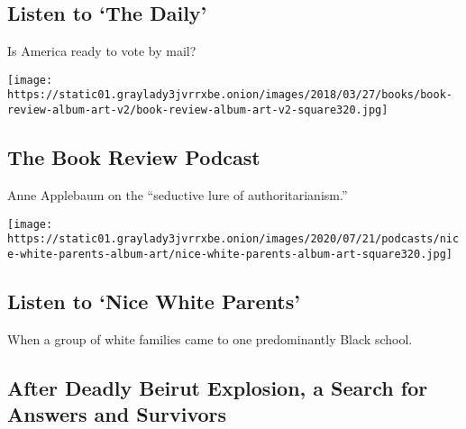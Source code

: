 \href{/2020/08/04/podcasts/the-daily/mail-in-voting-president-trump.html}{}

\hypertarget{listen-to-the-daily}{%
\subsection{Listen to `The Daily'}\label{listen-to-the-daily}}

Is America ready to vote by mail?

\href{/2020/07/31/books/review/podcast-twilight-democracy-anne-applebaum-eat-buddha-barbara-demick.html}{}

\texttt{[image: https://static01.graylady3jvrrxbe.onion/images/2018/03/27/books/book-review-album-art-v2/book-review-album-art-v2-square320.jpg]}

\href{/2020/07/31/books/review/podcast-twilight-democracy-anne-applebaum-eat-buddha-barbara-demick.html}{}

\hypertarget{the-book-review-podcast}{%
\subsection{The Book Review Podcast}\label{the-book-review-podcast}}

Anne Applebaum on the ``seductive lure of authoritarianism.''

\href{/2020/07/30/podcasts/nice-white-parents-serial.html}{}

\texttt{[image: https://static01.graylady3jvrrxbe.onion/images/2020/07/21/podcasts/nice-white-parents-album-art/nice-white-parents-album-art-square320.jpg]}

\href{/2020/07/30/podcasts/nice-white-parents-serial.html}{}

\hypertarget{listen-to-nice-white-parents}{%
\subsection{Listen to `Nice White
Parents'}\label{listen-to-nice-white-parents}}

When a group of white families came to one predominantly Black school.

\href{/2020/08/05/world/middleeast/beirut-explosion.html}{}

\hypertarget{after-deadly-beirut-explosion-a-search-for-answers-and-survivors}{%
\subsection{After Deadly Beirut Explosion, a Search for Answers and
Survivors}\label{after-deadly-beirut-explosion-a-search-for-answers-and-survivors}}

